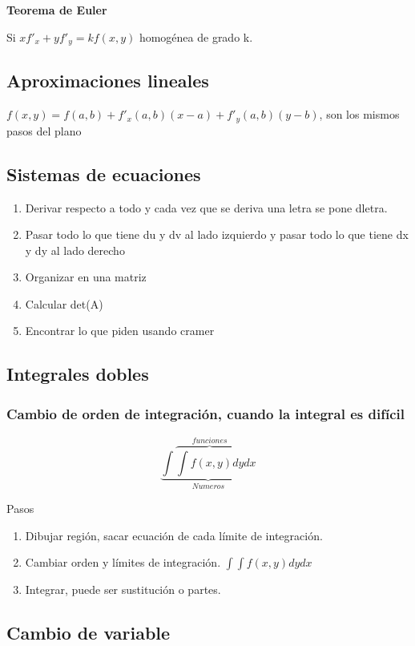 \textbf{Teorema de Euler}

Si $xf'_x+yf'_y=kf(x,y)$ homogénea de grado k.

\subsection{Aproximaciones lineales}

$f(x,y)=f(a,b)+f'_x(a,b)(x-a)+f'_y(a,b)(y-b)$, son los mismos pasos del plano

\subsection{Sistemas de ecuaciones}

\begin{enumerate}
	\item Derivar respecto a todo y cada vez que se deriva una letra se pone dletra.
	\item Pasar todo lo que tiene du y dv al lado izquierdo y pasar todo lo que tiene dx y dy al lado derecho
	\item Organizar en una matriz
	\item Calcular det(A)
	\item Encontrar lo que piden usando cramer
\end{enumerate}

\subsection{Integrales dobles}

\subsubsection{Cambio de orden de integración, cuando la integral es difícil}

$$\underbrace{\int\overbrace{\int f(x,y)dy}^{funciones}dx}_{Numeros}$$

Pasos

\begin{enumerate}
	\item Dibujar región, sacar ecuación de cada límite de integración.
	\item Cambiar orden y límites de integración. $\int\int f(x,y)dydx$
	\item Integrar, puede ser sustitución o partes.
\end{enumerate}

\subsection{Cambio de variable}

